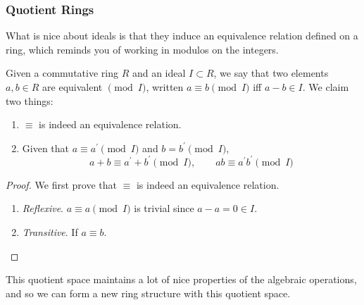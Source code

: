   \subsubsection{Quotient Rings}

    What is nice about ideals is that they induce an equivalence relation defined on a ring, which reminds you of working in modulos on the integers. 

    \begin{theorem}
      Given a commutative ring $R$ and an ideal $I \subset R$, we say that two elements $a, b \in R$ are equivalent $\pmod{I}$, written $a \equiv b \pmod{I}$ iff $a - b \in I$. We claim two things: 
      \begin{enumerate}
        \item $\equiv$ is indeed an equivalence relation. 
        \item Given that $a \equiv a^\prime \pmod{I}$ and $b = b^\prime \pmod{I}$, 
          \begin{equation}
            a + b \equiv a^\prime + b^\prime \pmod{I}, \qquad ab \equiv a^\prime b^\prime \pmod{I}
          \end{equation}
      \end{enumerate}
    \end{theorem}
    \begin{proof}
      We first prove that $\equiv$ is indeed an equivalence relation. 
      \begin{enumerate}
        \item \textit{Reflexive}. $a \equiv a \pmod{I}$ is trivial since $a - a = 0 \in I$. 
        \item \textit{Transitive}. If $a \equiv b$. 
      \end{enumerate}
    \end{proof}

    This quotient space maintains a lot of nice properties of the algebraic operations, and so we can form a new ring structure with this quotient space.  

